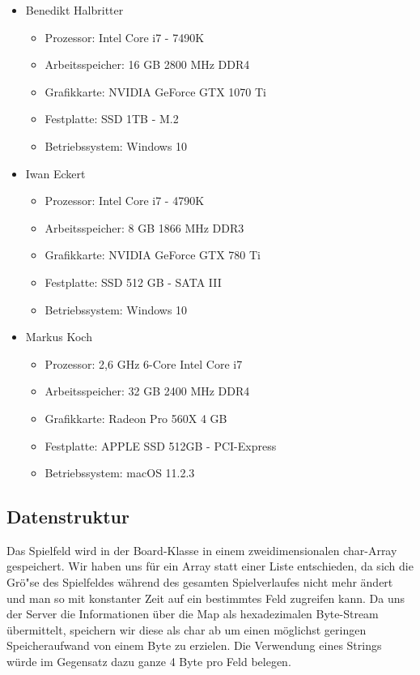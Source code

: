 \newpage

\begin{itemize}
    \item Benedikt Halbritter
    \begin{itemize}
        \item Prozessor: Intel Core i7 - 7490K
        \item Arbeitsspeicher: 16 GB 2800 MHz DDR4
        \item Grafikkarte: NVIDIA GeForce GTX 1070 Ti
        \item Festplatte: SSD 1TB - M.2
        \item Betriebssystem: Windows 10
    \end{itemize}
    \item Iwan Eckert
    \begin{itemize}
        \item Prozessor: Intel Core i7 - 4790K
        \item Arbeitsspeicher: 8 GB 1866 MHz DDR3
        \item Grafikkarte: NVIDIA GeForce GTX 780 Ti
        \item Festplatte: SSD 512 GB - SATA III
        \item Betriebssystem: Windows 10
    \end{itemize}
    \item Markus Koch
    \begin{itemize}
        \item Prozessor: 2,6 GHz 6-Core Intel Core i7
        \item Arbeitsspeicher: 32 GB 2400 MHz DDR4
        \item Grafikkarte: Radeon Pro 560X 4 GB
        \item Festplatte: APPLE SSD 512GB - PCI-Express
        \item Betriebssystem: macOS 11.2.3
    \end{itemize}
\end{itemize}

\newpage

\subsection{Datenstruktur}\label{subsec:datenstruktur}
Das Spielfeld wird in der Board-Klasse in einem zweidimensionalen char-Array gespeichert.
Wir haben uns f\"ur ein Array statt einer Liste entschieden, da sich die Gr\"o"se des Spielfeldes w\"ahrend des gesamten Spielverlaufes nicht mehr \"andert und man so mit konstanter Zeit auf ein bestimmtes Feld zugreifen kann.
Da uns der Server die Informationen \"uber die Map als hexadezimalen Byte-Stream \"ubermittelt, speichern wir diese als char ab um einen m\"oglichst geringen Speicheraufwand von einem Byte zu erzielen.
Die Verwendung eines Strings w\"urde im Gegensatz dazu ganze 4 Byte pro Feld belegen.

